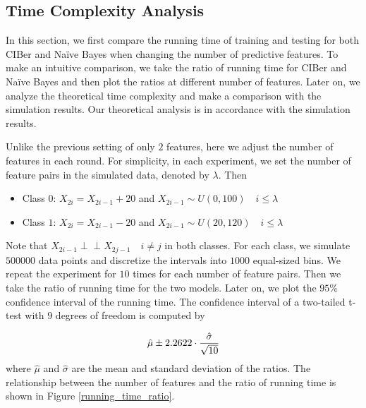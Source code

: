 \documentclass[twoside,11pt]{article}
\begin{document}
\subsection{Time Complexity Analysis}
In this section, we first compare the running time of training and testing for both CIBer and Na\"ive Bayes when changing the number of predictive features. To make an intuitive comparison, we take the ratio of running time for CIBer and Na\"ive Bayes and then plot the ratios at different number of features. Later on, we analyze the theoretical time complexity and make a comparison with the simulation results. Our theoretical analysis is in accordance with the simulation results.

Unlike the previous setting of only $2$ features, here we adjust the number of features in each round. For simplicity, in each experiment, we set the number of feature pairs in the simulated data, denoted by $\lambda$. Then 

\begin{itemize}
    \item Class $0$: $X_{2i} = X_{2i-1}+20$ and $X_{2i-1}\sim U(0,100)\quad i\leq\lambda$
    \item Class $1$: $X_{2i} = X_{2i-1}-20$ and $X_{2i-1}\sim U(20,120)\quad i\leq\lambda$
\end{itemize}

Note that $X_{2i-1}{\perp\!\!\!\perp}X_{2j-1}\quad i\neq j$ in both classes. For each class, we simulate $500000$ data points and discretize the intervals into $1000$ equal-sized bins. We repeat the experiment for $10$ times for each number of feature pairs. Then we take the ratio of running time for the two models. Later on, we plot the $95\%$ confidence interval of the running time. The confidence interval of a two-tailed t-test with $9$ degrees of freedom is computed by

\begin{equation*}
    \centering
    \hat{\mu}\pm2.2622\cdot\frac{\hat{\sigma}}{\sqrt{10}}
\end{equation*}
where $\hat{\mu}$ and $\hat{\sigma}$ are the mean and standard deviation of the ratios. The relationship between the number of features and the ratio of running time is shown in Figure \ref{running_time_ratio}.
\end{document}
